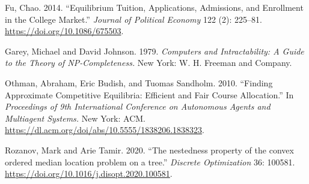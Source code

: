 \documentclass[12pt]{article} %
\theoremstyle{definition}
\theoremstyle{definition}
\begin{document}
Fu, Chao. 2014. ``Equilibrium Tuition, Applications, Admissions, and Enrollment in the College Market.'' \emph{Journal of Political Economy} 122 (2): 225--81. \url{https://doi.org/10.1086/675503}. 

Garey, Michael and David Johnson. 1979. \emph{Computers and Intractability: A Guide to the Theory of NP-Completeness.} New York: W. H. Freeman and Company. 

Othman, Abraham, Eric Budish, and Tuomas Sandholm. 2010. ``Finding Approximate Competitive Equilibria: Efficient and Fair
Course Allocation.'' In \emph{Proceedings of 9th International Conference on Autonomous Agents and Multiagent Systems.} New York: ACM. \url{https://dl.acm.org/doi/abs/10.5555/1838206.1838323}.

Rozanov, Mark and Arie Tamir. 2020. ``The nestedness property of the convex ordered median location problem on a tree.'' \emph{Discrete Optimization} 36: 100581. \url{https://doi.org/10.1016/j.disopt.2020.100581}.
\end{document}
